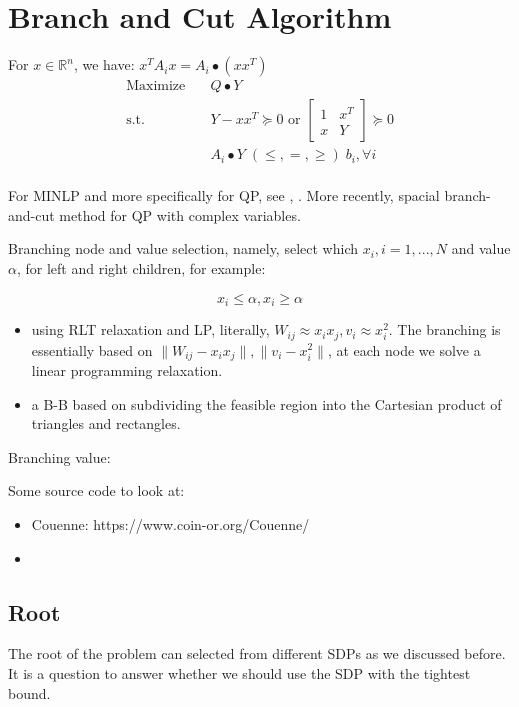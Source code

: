 \documentclass[../main]{subfiles}
\begin{document}
\section{Branch and Cut Algorithm}


For \(x \in \mathbb{R}^{n}\), we have: \(x^{T} A_{i} x = A_i \bullet (xx^T)\)
\begin{equation}
    \begin{aligned}
        \mathrm{Maximize}\quad & Q\bullet Y                                                        \\
        \mathrm{s.t.}  \quad   & Y-xx^T \succeq 0 \text { or } \begin{bmatrix} 1 & x^{T} \\ x & Y \end{bmatrix} \succeq 0 \\
                               & A_i \bullet Y \; (\le, =, \ge) \; b_i, \forall i                  \\
    \end{aligned}
\end{equation}

For MINLP and more specifically for QP, see \cite{belotti_mixed-integer_2013}, \cite{misener_glomiqo_2013}. More recently, spacial branch-and-cut method \cite{chen_spatial_2017} for QP with complex variables.


Branching node and value selection, namely, select which \(x_i, i = 1, ..., N\) and value \(\alpha\), for left and right children, for example:

\[x_i \le \alpha, x_i \ge \alpha\]

\begin{itemize}
    \item \cite{audet_branch_2000} using RLT relaxation and LP, literally, \(W_{ij} \approx x_i x_j , v_i \approx x_i^2\). The branching is essentially based on \(\|W_{ij} - x_ix_j\|, \|v_i - x_i^2\|\), at each node we solve a linear programming relaxation.
    \item \cite{linderoth_simplicial_2005} a B-B based on subdividing the feasible region into the Cartesian product of triangles and rectangles.

\end{itemize}
Branching value:


Some source code to look at:

\begin{itemize}
    \item Couenne: https://www.coin-or.org/Couenne/
    \item
\end{itemize}

\subsection{Root}

The root of the problem can selected from different SDPs as we discussed before. It is a question to answer whether we should use the SDP with the tightest bound.
\end{document}

